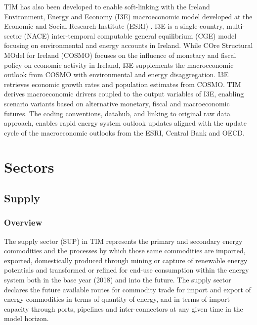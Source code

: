 \documentclass[journal abbreviation, manuscript]{copernicus}
\begin{document}
TIM has also been developed to enable soft-linking with the Ireland Environment, Energy and Economy (I3E) macroeconomic model developed at the Economic and Social Research Institute (ESRI) \cite{Yakut2020}. I3E is a single-country, multi-sector (NACE) inter-temporal computable general equilibrium (CGE) model focusing on environmental and energy accounts in Ireland. While COre Structural MOdel for Ireland (COSMO) focuses on the influence of monetary and fiscal policy on economic activity in Ireland, I3E supplements the macroeconomic outlook from COSMO with environmental and energy disaggregation. I3E retrieves economic growth rates and population estimates from COSMO. TIM derives macroeconomic drivers coupled to the output variables of I3E, enabling scenario variants based on alternative monetary, fiscal and macroeconomic futures. The coding conventions, datahub, and linking to original raw data approach, enables rapid energy system outlook updates aligned with the update cycle of the macroeconomic outlooks from the ESRI, Central Bank and OECD.


\section{Sectors}
\label{s:sectors}

\subsection{Supply}
\label{ss:supply}
\subsubsection{Overview}
The supply sector (SUP) in TIM represents the primary and secondary energy commodities and the processes by which those same commodities are imported, exported, domestically produced through mining or capture of renewable energy potentials and transformed or refined for end-use consumption within the energy system both in the base year (2018) and into the future. The supply sector declares the future available routes for commodity trade for import and export of energy commodities in terms of quantity of energy, and in terms of import capacity through ports, pipelines and inter-connectors at any given time in the model horizon. 
\end{document}

